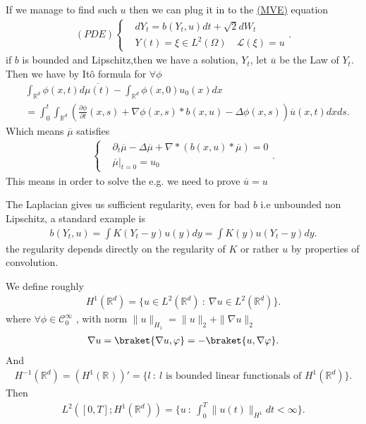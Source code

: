 \begin{remark}
 If we manage to find such $u$ then we can plug it in to the \hyperref[MVE]{(MVE)}   equation
 \begin{align*}
   (PDE)\begin{cases}
    &dY_t = b(Y_t,u) dt + \sqrt{2} dW_t \\
    &Y(t) = \xi \in  L^2(\Omega ) \quad \mathcal{L}(\xi) = u
  \end{cases}
 .\end{align*}
 if $b$ is bounded and Lipschitz,then we have a solution, $Y_t $, let $\overline{u} $ be the Law of $Y_t$.
 Then we have by It\^o formula for $\forall  \phi $
\begin{align*}
  &\int_{\mathbb{R}^{d} } \phi (x,t) d\overline{\mu(t)}  - \int_{\mathbb{R}^{d} } \phi(x,0) u_0(x) dx \\
  &=  \int_0^{t} \int_{\mathbb{R}^{d} } \left(\frac{\partial \phi }{\partial t}(x,s) + \nabla \phi(x,s)*b(x,u) -  \Delta \phi(x,s)\right)\overline{u}(x,t) dx ds
.\end{align*}
Which means $\overline{\mu } $ satisfies
\begin{align*}
  \begin{cases}
    &\partial_t \overline{\mu }  - \Delta \overline{\mu }  + \nabla * (b(x,u)*\overline{\mu } ) = 0\\
    &\overline{\mu } \rvert_{t=0}  = u_0
  \end{cases}
.\end{align*}
This means in order to solve the  e.g. we need to prove $\overline{u } = u  $
\end{remark}
The Laplacian gives us sufficient regularity, even for bad $b$ i.e unbounded non Lipschitz, a standard example is 
\begin{align*}
  b(Y_t,u) = \int K(Y_t-y)u(y) dy = \int K(y)u(Y_t-y) dy
.\end{align*}
the regularity depends directly on the regularity of $K$  or rather $u$ by properties of convolution.
\begin{definition}
 We define roughly  
 \begin{align*}
  H^1(\mathbb{R}^{d} ) = \{u \in  L^2(\mathbb{R}^{d}) \ : \ \nabla u \in  L^2(\mathbb{R}^{d}) \}  
 .\end{align*}
 where $\forall  \phi \in  \mathcal{C}_0^{\infty} $ , with norm $\|u\|_{H_{1}} = \|u\|_2 + \|\nabla u\|_2$
 \begin{align*}
   \nabla u = \braket{\nabla u , \phi } = -\braket{u,\nabla \phi }
 .\end{align*}
 And 
 \begin{align*}
  H^{-1}(\mathbb{R}^{d} )  =  (H^{1}(\mathbb{R}^{} ) )' =  \{l \ : \ l\text{ is bounded linear functionals of } H^{1}(\mathbb{R}^{d} )  \}  
 .\end{align*}
 Then  
 \begin{align*}
   L^2([0,T];H^{1}(\mathbb{R}^{d} ) ) = \{u \ : \ \int_0^{T} \|u(t)\|_{H^1} dt < \infty \}  
 .\end{align*}
\end{definition}
